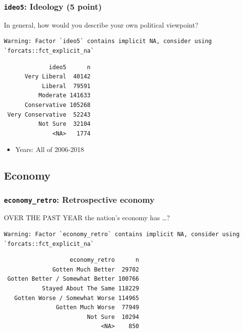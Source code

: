 \documentclass[10pt,article,oneside]{memoir}
\theoremstyle{definition}
\begin{document}
\hypertarget{ideo5-ideology-5-point}{%
\subsubsection{\texorpdfstring{\texttt{ideo5}: Ideology (5
point)}{ideo5: Ideology (5 point)}}\label{ideo5-ideology-5-point}}

In general, how would you describe your own political viewpoint?

\begin{verbatim}
Warning: Factor `ideo5` contains implicit NA, consider using
`forcats::fct_explicit_na`
\end{verbatim}

\begin{verbatim}
             ideo5      n
      Very Liberal  40142
           Liberal  79591
          Moderate 141633
      Conservative 105268
 Very Conservative  52243
          Not Sure  32104
              <NA>   1774
\end{verbatim}

\begin{itemize}
\tightlist
\item
  Years: All of 2006-2018
\end{itemize}

\hypertarget{economy}{%
\subsection{Economy}\label{economy}}

\hypertarget{economy_retro-retrospective-economy}{%
\subsubsection{\texorpdfstring{\texttt{economy\_retro}: Retrospective
economy}{economy\_retro: Retrospective economy}}\label{economy_retro-retrospective-economy}}

OVER THE PAST YEAR the nation's economy has \ldots{}?

\begin{verbatim}
Warning: Factor `economy_retro` contains implicit NA, consider using
`forcats::fct_explicit_na`
\end{verbatim}

\begin{verbatim}
                   economy_retro      n
              Gotten Much Better  29702
 Gotten Better / Somewhat Better 100766
           Stayed About The Same 118229
   Gotten Worse / Somewhat Worse 114965
               Gotten Much Worse  77949
                        Not Sure  10294
                            <NA>    850
\end{verbatim}
\end{document}

